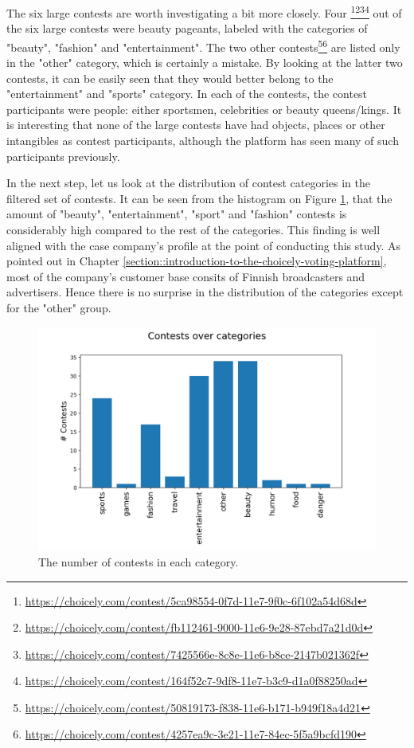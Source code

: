     The six large contests are worth investigating a bit more closely. Four \footnote{\url{https://choicely.com/contest/5ca98554-0f7d-11e7-9f0c-6f102a54d68d}}\footnote{\url{https://choicely.com/contest/fb112461-9000-11e6-9e28-87ebd7a21d0d}}\footnote{\url{https://choicely.com/contest/7425566e-8c8e-11e6-b8ce-2147b021362f}}\footnote{\url{https://choicely.com/contest/164f52c7-9df8-11e7-b3c9-d1a0f88250ad}}
    out of the six large contests were beauty pageants, labeled with the categories of "beauty", "fashion" and "entertainment". The two other contests\footnote{\url{https://choicely.com/contest/50819173-f838-11e6-b171-b949f18a4d21}}\footnote{\url{https://choicely.com/contest/4257ea9c-3e21-11e7-84ec-5f5a9bcfd190}}
    are listed only in the "other" category, which is certainly a mistake. By looking at the latter two contests, it can be easily seen that they would better belong to the "entertainment" and "sports" category. In each of the contests, the contest participants were people: either sportsmen, celebrities or beauty queens/kings. It is interesting that none of the large contests have had objects, places or other intangibles as contest participants, although the platform has seen many of such participants previously. 

    In the next step, let us look at the distribution of contest categories in the filtered set of contests. It can be seen from the histogram on Figure \ref{contests_over_categories}, that the amount of "beauty", "entertainment", "sport" and "fashion" contests is considerably high compared to the rest of the categories. This finding is well aligned with the case company's profile at the point of conducting this study. As pointed out in Chapter \ref{section::introduction-to-the-choicely-voting-platform}, most of the company's customer base consits of Finnish broadcasters and advertisers. Hence there is no surprise in the distribution of the categories except for the "other" group. 
    
    \begin{figure}[h] 
        \begin{center}
            \includegraphics[width=1\textwidth]{Images/contests_over_categories.png}
            \caption{The number of contests in each category.}
            \label{contests_over_categories}
        \end{center}
    \end{figure}
    
